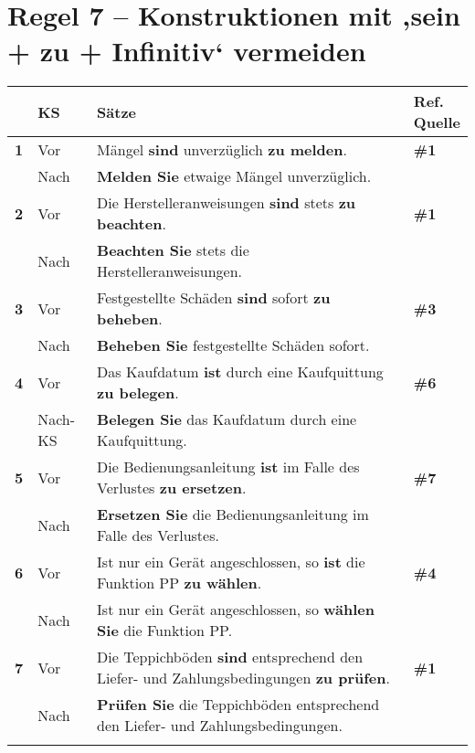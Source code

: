 \section*{Regel 7 -- Konstruktionen mit ‚sein + zu + Infinitiv‘ vermeiden}


\begin{longtable}{llp{}l}

\lsptoprule
{} & \textbf{KS} & \textbf{Sätze} & \makecell[tl]{\textbf{Ref.}\\\textbf{Quelle}}\\
\midrule
{ \textbf{1}} & Vor & Mängel \textbf{sind} unverzüglich \textbf{zu melden}. & \textbf{\#1}\\
& Nach & \textbf{Melden Sie} etwaige Mängel unverzüglich. & \\
\tablevspace
{ \textbf{2}} & Vor & Die Herstelleranweisungen \textbf{sind} stets \textbf{zu beachten}. & \textbf{\#1}\\
& Nach & \textbf{Beachten Sie} stets die Herstelleranweisungen. & \\
\tablevspace
{ \textbf{3}} & Vor & Festgestellte Schäden \textbf{sind} sofort \textbf{zu beheben}. & \textbf{\#3}\\
& Nach & \textbf{Beheben Sie} festgestellte Schäden sofort. & \\
\tablevspace
{ \textbf{4}} & Vor & Das Kaufdatum \textbf{ist} durch eine Kaufquittung \textbf{zu belegen}. & \textbf{\#6}\\
& Nach-KS & \textbf{Belegen Sie} das Kaufdatum durch eine Kaufquittung. & \\
\tablevspace
{ \textbf{5}} & Vor & Die Bedienungsanleitung \textbf{ist} im Falle des Verlustes \textbf{zu ersetzen}. & \textbf{\#7}\\
& Nach & \textbf{Ersetzen Sie} die Bedienungsanleitung im Falle des Verlustes. & \\
\tablevspace
{ \textbf{6}} & Vor & Ist nur ein Gerät angeschlossen, so \textbf{ist} die Funktion PP \textbf{zu wählen}. & \textbf{\#4}\\
& Nach & Ist nur ein Gerät angeschlossen, so \textbf{wählen Sie} die Funktion PP. & \\
\tablevspace
{ \textbf{7}} & Vor & Die Teppichböden \textbf{sind} entsprechend den Liefer- und Zahlungsbedingungen \textbf{zu prüfen}. & \textbf{\#1}\\
& Nach & \textbf{Prüfen Sie} die Teppichböden entsprechend den Liefer- und Zahlungsbedingungen. & \\
\tablevspace

\end{longtable}
